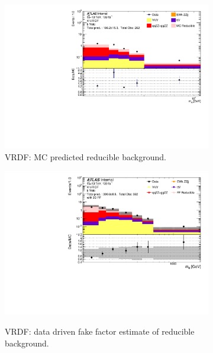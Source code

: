 \begin{figure}[htb]
	\centering
    \begin{subfigure}{.48\textwidth}
        \centering
        \includegraphics[width = 0.9\linewidth]{figures/Analysis/Background/Overlay_VRDF_MC_M4l.pdf}
        \caption{VRDF: MC predicted reducible background.\label{subfig:VRDFMCRed}}
    \end{subfigure}
	\begin{subfigure}{.48\textwidth}
        \centering
        \includegraphics[width = 0.9\linewidth]{figures/Analysis/Background/Overlay_VRDF_FFApplied_M4l.pdf}\\
		\caption{ VRDF: data driven fake factor estimate of reducible background. \label{subfig:VRDFFF} }
    \end{subfigure}
    \begin{subfigure}{.48\textwidth}
        \centering

\end{subfigure}
\end{figure}
